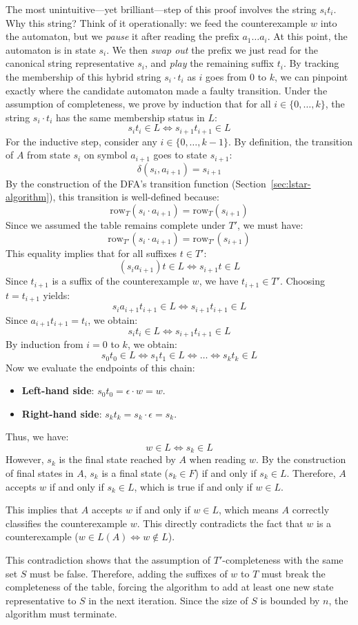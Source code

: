 \begin{formaldetails}
The most unintuitive---yet brilliant---step of this proof involves the string $s_i t_i$. Why this string? Think of it operationally: we feed the counterexample $w$ into the automaton, but we \emph{pause} it after reading the prefix $a_1 \dots a_i$. At this point, the automaton is in state $s_i$. We then \emph{swap out} the prefix we just read for the canonical string representative $s_i$, and \emph{play} the remaining suffix $t_i$. By tracking the membership of this hybrid string $s_i \cdot t_i$ as $i$ goes from $0$ to $k$, we can pinpoint exactly where the candidate automaton made a faulty transition. Under the assumption of completeness, we prove by induction that for all $i \in \{0, \dots, k\}$, the string $s_i \cdot t_i$ has the same membership status in $L$:
\[
  s_i t_i \in L \iff s_{i+1} t_{i+1} \in L
\]
For the inductive step, consider any $i \in \{0, \dots, k-1\}$. By definition, the transition of $A$ from state $s_i$ on symbol $a_{i+1}$ goes to state $s_{i+1}$:
\[
  \delta(s_i, a_{i+1}) = s_{i+1}
\]
By the construction of the DFA's transition function (Section~\ref{sec:lstar-algorithm}), this transition is well-defined because:
\[
  \text{row}_{T}(s_i \cdot a_{i+1}) = \text{row}_{T}(s_{i+1})
\]
Since we assumed the table remains complete under $T'$, we must have:
\[
  \text{row}_{T'}(s_i \cdot a_{i+1}) = \text{row}_{T'}(s_{i+1})
\]
This equality implies that for all suffixes $t \in T'$:
\[
  (s_i a_{i+1}) t \in L \iff s_{i+1} t \in L
\]
Since $t_{i+1}$ is a suffix of the counterexample $w$, we have $t_{i+1} \in T'$. Choosing $t = t_{i+1}$ yields:
\[
  s_i a_{i+1} t_{i+1} \in L \iff s_{i+1} t_{i+1} \in L
\]
Since $a_{i+1} t_{i+1} = t_i$, we obtain:
\[
  s_i t_i \in L \iff s_{i+1} t_{i+1} \in L
\]
By induction from $i = 0$ to $k$, we obtain:
\[
  s_0 t_0 \in L \iff s_1 t_1 \in L \iff \dots \iff s_k t_k \in L
\]
Now we evaluate the endpoints of this chain:
\begin{itemize}
  \item \textbf{Left-hand side}: $s_0 t_0 = \epsilon \cdot w = w$.
  \item \textbf{Right-hand side}: $s_k t_k = s_k \cdot \epsilon = s_k$.
\end{itemize}
Thus, we have:
\[
  w \in L \iff s_k \in L
\]
However, $s_k$ is the final state reached by $A$ when reading $w$. By the construction of final states in $A$, $s_k$ is a final state ($s_k \in F$) if and only if $s_k \in L$. Therefore, $A$ accepts $w$ if and only if $s_k \in L$, which is true if and only if $w \in L$.

This implies that $A$ accepts $w$ if and only if $w \in L$, which means $A$ correctly classifies the counterexample $w$. This directly contradicts the fact that $w$ is a counterexample ($w \in L(A) \iff w \notin L$).

This contradiction shows that the assumption of $T'$-completeness with the same set $S$ must be false. Therefore, adding the suffixes of $w$ to $T$ must break the completeness of the table, forcing the algorithm to add at least one new state representative to $S$ in the next iteration. Since the size of $S$ is bounded by $n$, the algorithm must terminate.
\end{formaldetails}

